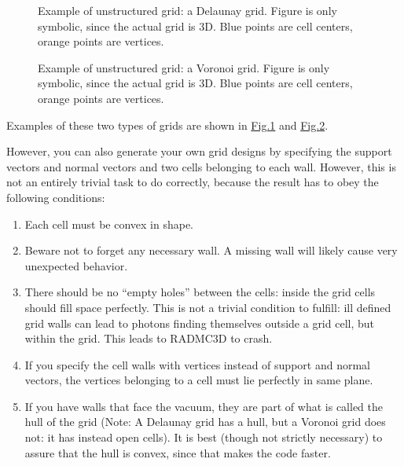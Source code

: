 \documentclass[letterpaper,10pt,english]{sphinxmanual}
\begin{document}
\begin{figure}[htbp]
\centering
\capstart

\noindent{}
\caption{Example of unstructured grid: a Delaunay grid. Figure is only symbolic, since
the actual grid is 3D. Blue points are cell centers, orange points are
vertices.}\label{\detokenize{gridding:id7}}\label{\detokenize{gridding:fig-delau}}\end{figure}

\begin{figure}[htbp]
\centering
\capstart

\noindent{}
\caption{Example of unstructured grid: a Voronoi grid. Figure is only symbolic, since
the actual grid is 3D. Blue points are cell centers, orange points are
vertices.}\label{\detokenize{gridding:id8}}\label{\detokenize{gridding:fig-voronoi}}\end{figure}

Examples of these two types of grids are shown in
\hyperref[\detokenize{gridding:fig-delau}]{Fig.\@ \ref{\detokenize{gridding:fig-delau}}} and \hyperref[\detokenize{gridding:fig-voronoi}]{Fig.\@ \ref{\detokenize{gridding:fig-voronoi}}}.

However, you can also generate your own grid designs by specifying the
support vectors and normal vectors and two cells belonging to each wall.
However, this is not an entirely trivial task to do correctly, because
the result has to obey the following conditions:
\begin{enumerate}
%
\item {} 
Each cell must be convex in shape.

\item {} 
Beware not to forget any necessary wall. A missing wall will likely
cause very unexpected behavior.

\item {} 
There should be no “empty holes” between the cells: inside the grid
cells should fill space perfectly. This is not a trivial condition
to fulfill: ill defined grid walls can lead to photons finding themselves
outside a grid cell, but within the grid. This leads to RADMC\sphinxhyphen{}3D
to crash.

\item {} 
If you specify the cell walls with vertices instead of support\sphinxhyphen{} and
normal vectors, the vertices belonging to a cell must lie perfectly
in same plane.

\item {} 
If you have walls that face the vacuum, they are part of what is called
the hull of the grid (Note: A Delaunay grid has a hull, but a Voronoi
grid does not: it has instead open cells). It is best (though not
strictly necessary) to assure that the hull is convex, since that
makes the code faster.

\end{enumerate}
\end{document}
